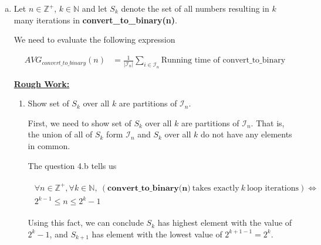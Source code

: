 \documentclass[12pt]{article}
\begin{document}
\begin{enumerate}[a.]
\begin{mdframed}
    \end{mdframed}

    \item

    Let $n \in \mathbb{Z}^+$, $k \in \mathbb{N}$ and let $S_k$ denote the set
    of all numbers resulting in $k$ many iterations in \textbf{convert\_to\_binary(n)}.

    \bigskip

    We need to evaluate the following expression

    \setcounter{equation}{0}
    \begin{align}
        AVG_{convert\_to\_binary}(n) &= \frac{1}{\lvert \mathcal{I}_n \rvert} \sum\limits_{i \in \mathcal{I}_n} \text{Running time of convert\_to\_binary}
    \end{align}

    \bigskip

    \begin{mdframed}

    \underline{\textbf{Rough Work:}}

    \bigskip

    \begin{enumerate}[1.]

        \item Show set of $S_k$ over all $k$ are partitions of $\mathcal{I}_n$.

        \begin{mdframed}
            First, we need to show set of $S_k$ over all $k$ are partitions of $\mathcal{I}_n$.
            That is, the union of all of $S_k$ form $\mathcal{I}_n$ and $S_k$ over all $k$ do
            not have any elements in common.

            \bigskip

            The question 4.b tells us

            \begin{align}
                \begin{split}
                \forall n \in \mathbb{Z}^+, \forall k \in \mathbb{N},\: (\textbf{
                convert\_to\_binary(n)}\:\text{takes exactly}\:k\:\text{loop iterations}) \Leftrightarrow
                \\ 2^{k-1} \leq n \leq 2^k -1
                \end{split}
            \end{align}

            Using this fact, we can conclude $S_k$ has highest element with the value of $2^k - 1$,
            and $S_{k+1}$ has element with the lowest value of $2^{k+1-1}=2^k$.


\end{mdframed}
\end{enumerate}
\end{mdframed}
\end{enumerate}
\end{document}
